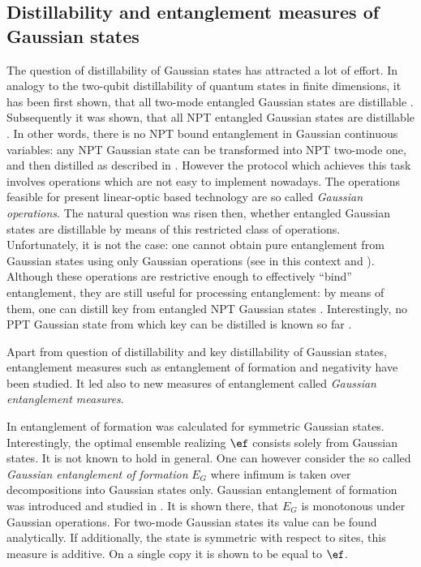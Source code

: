 \documentclass[twocolumn,aps,rmp]{revtex4}
\begin{document}
\subsection{Distillability and entanglement measures of Gaussian states}
\label{subsec:gaussian-measures}

The question of distillability of Gaussian states has attracted a lot
of effort. In analogy to the two-qubit distillability of quantum
states in finite dimensions, it has been first shown, that all
two-mode entangled Gaussian states are distillable
\cite{G2D_GieDuaCirZol}. Subsequently it was shown, that all NPT
entangled Gaussian states are distillable \cite{GallD_GieDuaCirZol}.
In other words, there is no NPT bound entanglement in Gaussian
continuous variables: any NPT Gaussian state can be transformed into
NPT two-mode one, and then distilled as described in
\cite{G2D_GieDuaCirZol}. However the protocol which achieves this task
involves operations which are not easy to implement nowadays.  The
operations feasible for present linear-optic based technology are so
called {\it Gaussian operations}. The natural question was risen then,
whether entangled Gaussian states are distillable by means of this
restricted class of operations. Unfortunately, it is not the case: one
cannot obtain pure entanglement from Gaussian states using only
Gaussian operations \cite{GnonD_GieCir} (see in this context
\cite{GnonD_Fiu} and \cite{GnonD_EisSchPle}). Although these
operations are restrictive enough to effectively ``bind''
entanglement, they are still useful for processing entanglement: by
means of them, one can distill key from entangled NPT Gaussian states
\cite{GKD_NavBaeCirLewSanAci}. Interestingly, no PPT Gaussian state
from which key can be distilled is known so far
\cite{GPPTnonD_Nav_Aci}.

Apart from question of distillability and key distillability of
Gaussian states, entanglement measures such as entanglement of
formation and negativity have been studied. It led also to new
measures of entanglement called {\it Gaussian entanglement measures}.

In \cite{GEform_GieVolKruWerCir} entanglement of formation was
calculated for symmetric Gaussian states. Interestingly, the optimal
ensemble realizing $\ef$ consists solely from Gaussian states. It is
not known to hold in general. One can however consider the so called
{\it Gaussian entanglement of formation} $E_G$ where infimum is taken
over decompositions into Gaussian states only. Gaussian entanglement
of formation was introduced and studied in
\cite{GEform_GieVolKruWerCir}. It is shown there, that $E_G$ is
monotonous under Gaussian operations. For two-mode Gaussian states its
value can be found analytically. If additionally, the state is
symmetric with respect to sites, this measure is additive. On a single
copy it is shown to be equal to $\ef$.
\end{document}
